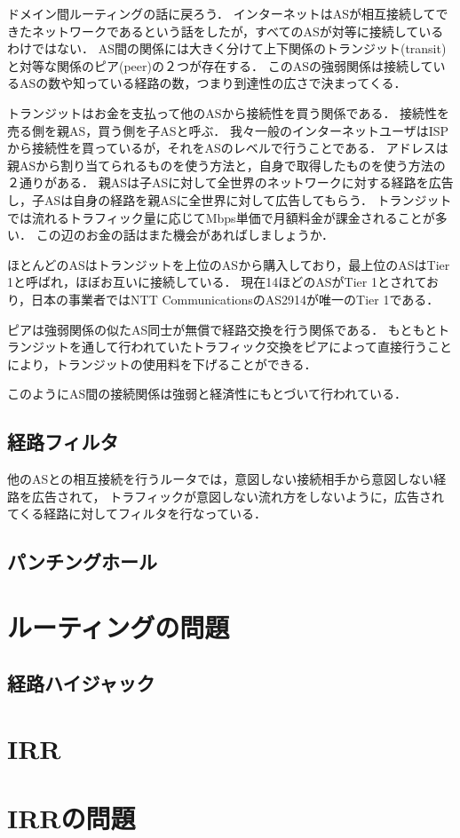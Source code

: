 ドメイン間ルーティングの話に戻ろう．
インターネットはASが相互接続してできたネットワークであるという話をしたが，すべてのASが対等に接続しているわけではない．
AS間の関係には大きく分けて上下関係のトランジット(transit)と対等な関係のピア(peer)の２つが存在する．
このASの強弱関係は接続しているASの数や知っている経路の数，つまり到達性の広さで決まってくる．

トランジットはお金を支払って他のASから接続性を買う関係である．
接続性を売る側を親AS，買う側を子ASと呼ぶ．
我々一般のインターネットユーザはISPから接続性を買っているが，それをASのレベルで行うことである．
アドレスは親ASから割り当てられるものを使う方法と，自身で取得したものを使う方法の２通りがある．
親ASは子ASに対して全世界のネットワークに対する経路を広告し，子ASは自身の経路を親ASに全世界に対して広告してもらう．
トランジットでは流れるトラフィック量に応じてMbps単価で月額料金が課金されることが多い．
この辺のお金の話はまた機会があればしましょうか．

ほとんどのASはトランジットを上位のASから購入しており，最上位のASはTier 1と呼ばれ，ほぼお互いに接続している．
現在14ほどのASがTier 1とされており，日本の事業者ではNTT CommunicationsのAS2914が唯一のTier 1である．

ピアは強弱関係の似たAS同士が無償で経路交換を行う関係である．
もともとトランジットを通して行われていたトラフィック交換をピアによって直接行うことにより，トランジットの使用料を下げることができる．

このようにAS間の接続関係は強弱と経済性にもとづいて行われている．

\subsection{経路フィルタ}

他のASとの相互接続を行うルータでは，意図しない接続相手から意図しない経路を広告されて，
トラフィックが意図しない流れ方をしないように，広告されてくる経路に対してフィルタを行なっている．

\subsection{パンチングホール}

\section{ルーティングの問題}

\subsection{経路ハイジャック}

\section{IRR}

\section{IRRの問題}



%
%
